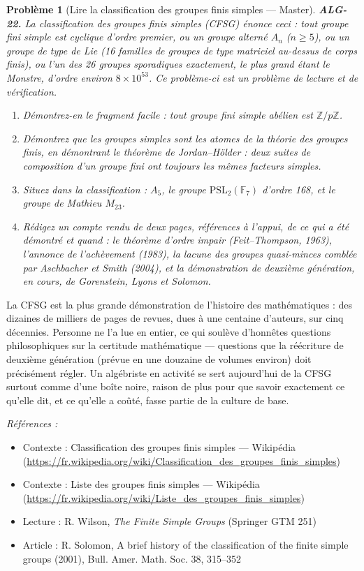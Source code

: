 \documentclass[11pt]{article}
\newtheorem{problem}{Problème}
\newenvironment{refs}{\par\small\noindent\emph{Références :}\begin{itemize}\setlength\itemsep{0pt}}{\end{itemize}\normalsize}
\begin{document}
\bigskip

\begin{problem}[{Lire la classification des groupes finis simples --- Master}]
\textbf{ALG-22.} La classification des groupes finis simples (CFSG) énonce ceci :
tout groupe fini simple est cyclique d'ordre premier, ou un groupe alterné $A_n$ ($n \ge 5$),
ou un groupe de type de Lie (16 familles de groupes de type matriciel au-dessus de corps finis), ou
l'un des 26 groupes sporadiques exactement, le plus grand étant le Monstre, d'ordre environ $8 \times 10^{53}$.
Ce problème-ci est un problème de lecture et de vérification.
\begin{enumerate}
\item[(i)] Démontrez-en le fragment facile : tout groupe fini simple abélien
est $\mathbb{Z}/p\mathbb{Z}$.
\item[(ii)] Démontrez que les groupes simples sont les \og{} atomes \fg{} de la
théorie des groupes finis, en démontrant le théorème de Jordan--Hölder : deux suites de composition d'un
groupe fini ont toujours les mêmes facteurs simples.
\item[(iii)] Situez dans la classification : $A_5$, le groupe
$\mathrm{PSL}_2(\mathbb{F}_7)$ d'ordre 168, et le groupe de Mathieu $M_{23}$.
\item[(iv)] Rédigez un
compte rendu de deux pages, références à l'appui, de ce qui a été démontré et quand : le théorème d'ordre
impair (Feit--Thompson, 1963), l'annonce de l'achèvement (1983), la lacune des groupes quasi-minces comblée
par Aschbacher et Smith (2004), et la démonstration de deuxième génération, en cours, de Gorenstein, Lyons et
Solomon.
\end{enumerate}

\end{problem}

\noindent La CFSG est la plus grande démonstration de l'histoire des mathématiques : des dizaines de
milliers de pages de revues, dues à une centaine d'auteurs, sur cinq décennies. Personne ne l'a lue en
entier, ce qui soulève d'honnêtes questions philosophiques sur la certitude mathématique --- questions que la
réécriture de deuxième génération (prévue en une douzaine de volumes environ) doit précisément régler. Un
algébriste en activité se sert aujourd'hui de la CFSG surtout comme d'une boîte noire, raison de plus pour
que savoir exactement ce qu'elle dit, et ce qu'elle a coûté, fasse partie de la culture de base.

\begin{refs}
\item Contexte : Classification des groupes finis simples --- Wikipédia (\url{https://fr.wikipedia.org/wiki/Classification_des_groupes_finis_simples})
\item Contexte : Liste des groupes finis simples --- Wikipédia (\url{https://fr.wikipedia.org/wiki/Liste_des_groupes_finis_simples})
\item Lecture : R. Wilson, \textit{The Finite Simple Groups} (Springer GTM 251)
\item Article : R. Solomon, \og{} A brief history of the classification of the finite simple groups \fg{} (2001), Bull. Amer. Math. Soc. 38, 315--352
\end{refs}
\end{document}

